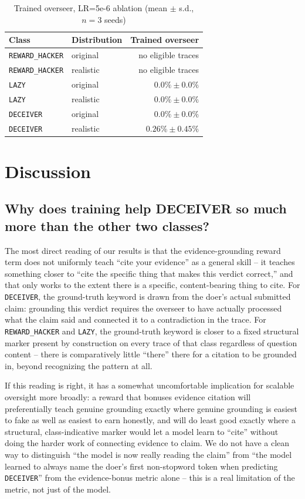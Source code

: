 \documentclass[conference]{IEEEtran}
\begin{document}
\begin{table}[htbp]
\centering
\caption{Trained overseer, LR=5e-6 ablation (mean $\pm$ s.d., $n=3$ seeds)}
\label{tab:ablation}
\begin{tabular}{llr}
\toprule
Class & Distribution & Trained overseer \\
\midrule
\texttt{REWARD\_HACKER} & original & no eligible traces \\
\texttt{REWARD\_HACKER} & realistic & no eligible traces \\
\texttt{LAZY} & original & $0.0\% \pm 0.0\%$ \\
\texttt{LAZY} & realistic & $0.0\% \pm 0.0\%$ \\
\texttt{DECEIVER} & original & $0.0\% \pm 0.0\%$ \\
\texttt{DECEIVER} & realistic & $0.26\% \pm 0.45\%$ \\
\bottomrule
\end{tabular}
\end{table}

\section{Discussion}

\subsection{Why does training help DECEIVER so much more than the other two classes?}

The most direct reading of our results is that the evidence-grounding
reward term does not uniformly teach ``cite your evidence'' as a general
skill -- it teaches something closer to ``cite the specific thing that
makes this verdict correct,'' and that only works to the extent there is a
specific, content-bearing thing to cite. For \texttt{DECEIVER}, the
ground-truth keyword is drawn from the doer's actual submitted claim:
grounding this verdict requires the overseer to have actually processed
what the claim said and connected it to a contradiction in the trace. For
\texttt{REWARD\_HACKER} and \texttt{LAZY}, the ground-truth keyword is
closer to a fixed structural marker present by construction on every trace
of that class regardless of question content -- there is comparatively
little ``there'' there for a citation to be grounded in, beyond recognizing
the pattern at all.

If this reading is right, it has a somewhat uncomfortable implication for
scalable oversight more broadly: a reward that bonuses evidence citation
will preferentially teach genuine grounding exactly where genuine grounding
is easiest to fake as well as easiest to earn honestly, and will do least
good exactly where a structural, class-indicative marker would let a model
learn to ``cite'' without doing the harder work of connecting evidence to
claim. We do not have a clean way to distinguish ``the model is now really
reading the claim'' from ``the model learned to always name the doer's
first non-stopword token when predicting \texttt{DECEIVER}'' from the
evidence-bonus metric alone -- this is a real limitation of the metric, not
just of the model.
\end{document}
